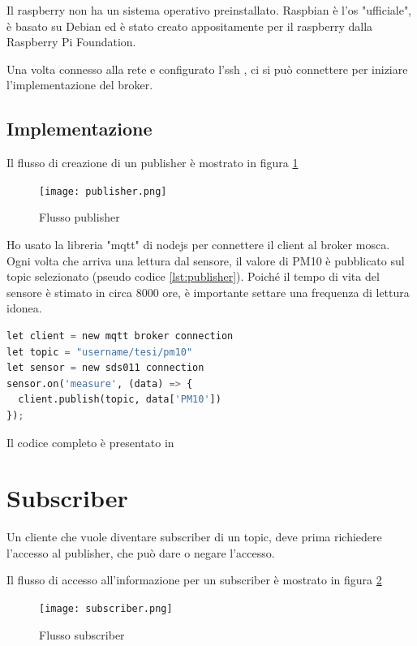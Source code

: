Il raspberry non ha un sistema operativo preinstallato. Raspbian è l'os "ufficiale", è basato su Debian ed è stato creato appositamente per il raspberry dalla Raspberry Pi Foundation. 

Una volta connesso alla rete e configurato l'ssh \cite{setupraspberry}, ci si può connettere per iniziare l'implementazione del broker. 

\subsection{Implementazione}
Il flusso di creazione di un publisher è mostrato in figura \ref{fig:publisher}
\begin{figure}
\begin{center}
  \texttt{[image: publisher.png]}%
  \caption{Flusso publisher}
  \label{fig:publisher}
\end{center}
\end{figure}

Ho usato la libreria "mqtt" di nodejs per connettere il client al broker mosca. Ogni volta che arriva una lettura dal sensore, il valore di PM10 è pubblicato sul topic selezionato (pseudo codice \ref{lst:publisher}). Poiché il tempo di vita del sensore è stimato in circa 8000 ore, è importante settare una frequenza di lettura idonea.  

\begin{lstlisting}[language=Python, caption={Publisher Pseudocode}, label={lst:publisher}]
let client = new mqtt broker connection
let topic = "username/tesi/pm10"
let sensor = new sds011 connection
sensor.on('measure', (data) => {
  client.publish(topic, data['PM10'])
});
\end{lstlisting}

Il codice completo è presentato in

\newpage
\section{Subscriber}
Un cliente che vuole diventare subscriber di un topic, deve prima richiedere l'accesso al publisher, che può dare o negare l'accesso. 

Il flusso di accesso all'informazione per un subscriber è mostrato in figura \ref{fig:subscriber}
\begin{figure}
\begin{center}
  \texttt{[image: subscriber.png]}%
  \caption{Flusso subscriber}
  \label{fig:subscriber}
\end{center}
\end{figure}

